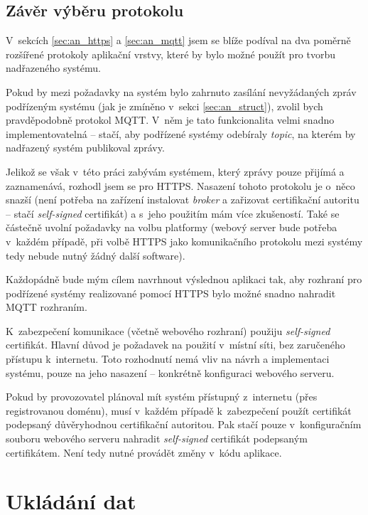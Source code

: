 \subsection{Závěr výběru protokolu}

V~sekcích \ref{sec:an_https} a \ref{sec:an_mqtt} jsem se blíže podíval na dva poměrně rozšířené protokoly aplikační vrstvy, které by bylo možné použít pro tvorbu nadřazeného systému.

Pokud by mezi požadavky na systém bylo zahrnuto zasílání nevyžádaných zpráv podřízeným systému (jak je zmíněno v~sekci \ref{sec:an_struct}), zvolil bych pravděpodobně protokol MQTT. V~něm je tato funkcionalita velmi snadno implementovatelná -- stačí, aby podřízené systémy odebíraly \textit{topic}, na kterém by nadřazený systém publikoval zprávy.

Jelikož se však v~této práci zabývám systémem, který zprávy pouze přijímá a zaznamenává, rozhodl jsem se pro HTTPS. Nasazení tohoto protokolu je o~něco snazší (není potřeba na zařízení instalovat \textit{broker} a zařizovat certifikační autoritu -- stačí \textit{self-signed} certifikát) a s~jeho použitím mám více zkušeností. Také se částečně uvolní požadavky na volbu platformy (webový server bude potřeba v~každém případě, při volbě HTTPS jako komunikačního protokolu mezi systémy tedy nebude nutný žádný další software). 

Každopádně bude mým cílem navrhnout výslednou aplikaci tak, aby rozhraní pro podřízené systémy realizované pomocí HTTPS bylo možné snadno nahradit MQTT rozhraním.

K~zabezpečení komunikace (včetně webového rozhraní) použiju \textit{self-signed} certifikát. Hlavní důvod je požadavek na použití v~místní síti, bez zaručeného přístupu k~internetu. Toto rozhodnutí nemá vliv na návrh a implementaci systému, pouze na jeho nasazení -- konkrétně konfiguraci webového serveru.

Pokud by provozovatel plánoval mít systém přístupný z~internetu (přes registrovanou doménu), musí v~každém případě k~zabezpečení použít certifikát podepsaný důvěryhodnou certifikační autoritou. Pak stačí pouze v~konfiguračním souboru webového serveru nahradit \textit{self-signed} certifikát podepsaným certifikátem. Není tedy nutné provádět změny v~kódu aplikace.

\section{Ukládání dat}
\label{sec:an_data}

